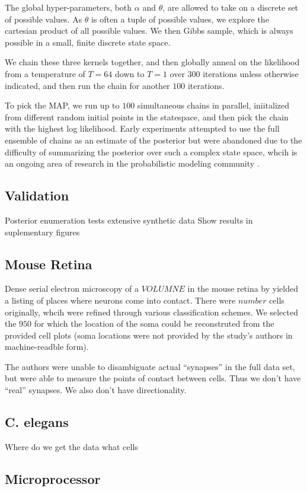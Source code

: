 \documentclass{article}
\begin{document}
The global hyper-parameters, both $\alpha$ and $\theta$, are allowed
to take on a discrete set of possible values. As $\theta$ is often a
tuple of possible values, we explore the cartesian product of all
possible values. We then Gibbs sample, which is always possible in a 
small, finite discrete state space. 

We chain these three kernels together, and then globally
anneal on the likelihood from a temperature of $T=64$ down to 
$T=1$ over 300 iterations unless otherwise indicated, and
then run the chain for another $100$ iterations. 

To pick the MAP, we run up to $100$ simultaneous chains in parallel, 
iniitalized from different random initial points in the statespace, 
and then pick the chain with the highest log likelihood. Early experiments
attempted to use the full ensemble of chains as an estimate
of the posterior but were abandoned due to the difficulty of
summarizing the posterior over such a complex state space, whcih is
an ongoing area of research in the probabilistic modeling community \autocite{}. 


\subsection{Validation}
Posterior enumeration tests
extensive synthetic data
Show results in suplementary figures

\subsection {Mouse Retina}
Dense serial electron microscopy of a $VOLUMNE$ in the mouse
retina by \autocite{Helmstaedter2013} yielded a listing of places where
neurons come into contact. There were $number$ cells originally, whcih
were refined through various classification schemes. We selected the
$950$ for which the location of the soma could be reconstruted from
the provided cell plots (soma locations were not provided by the
study's authors in machine-readble form).

The authors were unable to disambiguate actual ``synapses'' in the
full data set, but were able to measure the points of contact between
cells. Thus we don't have ``real'' synapses. We also don't have directionality. 

\subsection{C. elegans}
Where do we get the data
what cells


\subsection{Microprocessor}
\end{document}
